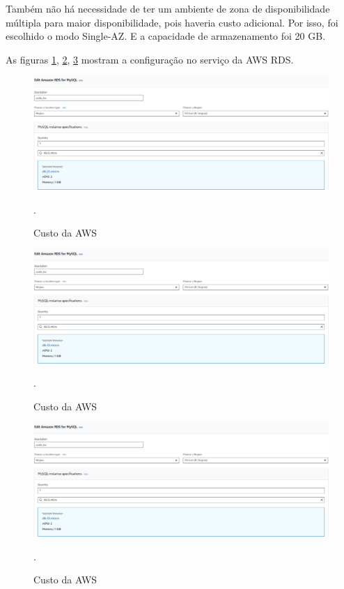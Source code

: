 Também não há necessidade de ter um ambiente de zona de disponibilidade múltipla para maior disponibilidade, pois haveria custo adicional. Por isso, foi escolhido o modo Single-AZ. E a capacidade de armazenamento foi 20 GB.

As figuras \ref{figure:custo_aws_configuracao_1}, \ref{figure:custo_aws_configuracao_2}, \ref{figure:custo_aws_configuracao_3} mostram a configuração no serviço da AWS RDS.

\begin{figure}[hp]
    \centering
    
    \includegraphics[scale=0.5]{figures/custo_aws_configuracao.PNG}
    \caption{Custo da AWS}.
    \label{figure:custo_aws_configuracao_1}
    
\end{figure}

\begin{figure}[hp]
    \centering
    
    \includegraphics[scale=0.5]{figures/custo_aws_configuracao.PNG}
    \caption{Custo da AWS}.
    \label{figure:custo_aws_configuracao_2}
    
\end{figure}

\begin{figure}[hp]
    \centering
    
    \includegraphics[scale=0.5]{figures/custo_aws_configuracao.PNG}
    \caption{Custo da AWS}.
    \label{figure:custo_aws_configuracao_3}
    
\end{figure}